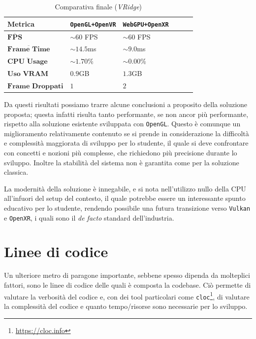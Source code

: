\documentclass[a4paper, 11pt, twoside]{report}
\begin{document}
\begin{table}[h]
\centering
\caption{Comparativa finale (\textit{VRidge})}
\begin{tabular}{lp{5cm}lp{5cm}lp{5cm}}
\toprule
\textbf{Metrica} &
\textcolor{blue!40}{\textbf{\texttt{OpenGL+OpenVR}}} &
\textcolor{violet!75}{\textbf{\texttt{WebGPU+OpenXR}}}                       \\
\midrule
$\overline{\textbf{FPS}}$        & $\sim60$ FPS & $\sim60$ FPS               \\
$\overline{\textbf{Frame Time}}$ & $\sim14.5$ms & $\sim9.0$ms                \\
$\overline{\textbf{CPU Usage}}$  & $\sim1.70$\% & $\sim0.00$\%               \\
$\textbf{Uso VRAM}$              & $0.9$GB      & $1.3$GB                    \\
$\textbf{Frame Droppati}$        & $1$          & $2$                        \\
\bottomrule
\end{tabular}
\end{table}

Da questi risultati possiamo trarre alcune conclusioni a proposito della soluzione proposta; questa infatti risulta
tanto performante, se non ancor più performante, rispetto alla soluzione esistente sviluppata con \texttt{OpenGL}.
Questo è comunque un miglioramento relativamente contenuto se si prende in considerazione la difficoltà e complessità
maggiorata di sviluppo per lo studente, il quale si deve confrontare con concetti e nozioni più complesse, che
richiedono più precisione durante lo sviluppo. Inoltre la stabilità del sistema non è garantita come per la soluzione
classica.

La modernità della soluzione è innegabile, e si nota nell'utilizzo nullo della CPU all'infuori del setup del contesto,
il quale potrebbe essere un interessante spunto educativo per lo studente, rendendo possibile una futura transizione
verso \texttt{\gls{Vulkan}} e \texttt{\gls{OpenXR}}, i quali sono il \textit{de facto} standard dell'industria.

\section{Linee di codice}

Un ulteriore metro di paragone importante, sebbene spesso dipenda da molteplici fattori, sono le linee di codice delle
quali è composta la codebase. Ciò permette di valutare la verbosità del codice e, con dei tool particolari come
\texttt{cloc}\footnote{\url{https://cloc.info}}, di valutare la complessità del codice e quanto tempo/risorse sono
necessarie per lo sviluppo.
\end{document}
